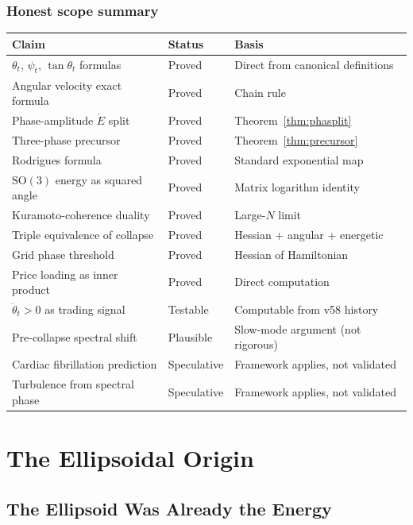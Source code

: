\documentclass[11pt,a4paper,openany]{book}
\theoremstyle{definition}
\newcommand{\SO}{\mathrm{SO}}
\begin{document}
\section{Honest scope summary}

\begin{center}
\renewcommand{\arraystretch}{1.3}
\begin{tabular}{p{5.5cm}p{2.5cm}p{5cm}}
\toprule
\textbf{Claim} & \textbf{Status} & \textbf{Basis} \\
\midrule
$\theta_t$, $\psi_t$, $\tan\theta_t$ formulas & Proved & Direct from canonical definitions \\
Angular velocity exact formula & Proved & Chain rule \\
Phase-amplitude $\dot E$ split & Proved & Theorem~\ref{thm:phasplit} \\
Three-phase precursor & Proved & Theorem~\ref{thm:precursor} \\
Rodrigues formula & Proved & Standard exponential map \\
$\SO(3)$ energy as squared angle & Proved & Matrix logarithm identity \\
Kuramoto-coherence duality & Proved & Large-$N$ limit \\
Triple equivalence of collapse & Proved & Hessian + angular + energetic \\
Grid phase threshold & Proved & Hessian of Hamiltonian \\
Price loading as inner product & Proved & Direct computation \\
\midrule
$\ddot\theta_t > 0$ as trading signal & Testable & Computable from v58 history \\
Pre-collapse spectral shift & Plausible & Slow-mode argument (not rigorous) \\
Cardiac fibrillation prediction & Speculative & Framework applies, not validated \\
Turbulence from spectral phase & Speculative & Framework applies, not validated \\
\bottomrule
\end{tabular}
\end{center}

\part{The Ellipsoidal Origin}

\chapter{The Ellipsoid Was Already the Energy}
\end{document}
